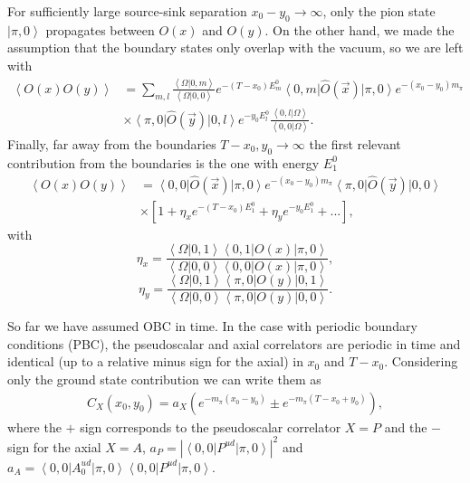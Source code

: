 For sufficiently large source-sink separation $x_0-y_0\rightarrow\infty$, only the pion state $\left|\pi,0\right>$ propagates between $O(x)$ and $O(y)$. On the other hand, we made the assumption that the boundary states only overlap with the vacuum, so we are left with
\begin{align}
\left<O(x)O(y)\right>&=\sum_{m,l}\frac{\left<\Omega|0,m\right>}{\left<\Omega|0,0\right>}e^{-(T-x_0)E_m^{0}}\left<0,m\right|\hat{O}(\vec{x})\left|\pi,0\right>e^{-(x_0-y_0)m_{\pi}}\\&\times\left<\pi,0\right|\hat{O}(\vec{y})\left|0,l\right>e^{-y_0E_l^{0}}\frac{\left<0,l|\Omega\right>}{\left<0,0|\Omega\right>}.
\end{align}
Finally, far away from the boundaries $T-x_0,y_0\rightarrow\infty$ the first relevant contribution from the boundaries is the one with energy $E_1^0$
\begin{align}
\left<O(x)O(y)\right>&=\left<0,0\right|\hat{O}(\vec{x})\left|\pi,0\right>e^{-(x_0-y_0)m_{\pi}}\left<\pi,0\right|\hat{O}(\vec{y})\left|0,0\right>\\&\times\left[1+\eta_xe^{-(T-x_0)E_1^0}+\eta_ye^{-y_0E_1^0}+...\right],
\end{align}
with 
\begin{equation}
\eta_x=\frac{\left<\Omega|0,1\right>\left<0,1\right|O(x)\left|\pi,0\right>}{\left<\Omega|0,0\right>\left<0,0\right|O(x)\left|\pi,0\right>},
\end{equation}
\begin{equation}
\eta_y=\frac{\left<\Omega|0,1\right>\left<\pi,0\right|O(y)\left|0,1\right>}{\left<\Omega|0,0\right>\left<\pi,0\right|O(y)\left|0,0\right>}.
\end{equation}

So far we have assumed OBC in time. In the case with periodic boundary conditions (PBC), the pseudoscalar and axial correlators are periodic in time and identical (up to a relative minus sign for the axial) in $x_0$ and $T-x_0$. Considering only the ground state contribution we can write them as
\begin{align}
\label{ch_observables:eq:corrs_PBC}
C_X(x_0,y_0)=a_X\left(e^{-m_{\pi}(x_0-y_0)}\pm e^{-m_{\pi}(T-x_0+y_0)}\right),
\end{align}
where the $+$ sign corresponds to the pseudoscalar correlator $X=P$ and the $-$ sign for the axial $X=A$,  $a_P=|\left<0,0\right|P^{ud}\left|\pi,0\right>|^2$ and $a_A=\left<0,0\right|A_0^{ud}\left|\pi,0\right>\left<0,0\right|P^{ud}\left|\pi,0\right>$. 

